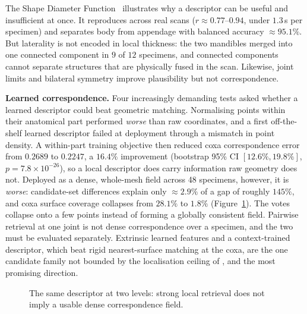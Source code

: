 The Shape Diameter Function~\cite{sdf} illustrates why a descriptor can be
useful and insufficient at once. It reproduces across real scans
($r\approx0.77$--$0.94$, under $1.3$\,s per specimen) and separates body from
appendage with balanced accuracy $\approx95.1\%$. But laterality is not encoded
in local thickness: the two mandibles merged into one connected component in
$9$ of $12$ specimens, and connected components cannot separate structures that
are physically fused in the scan. Likewise, joint limits and bilateral symmetry
improve plausibility but not correspondence.

\textbf{Learned correspondence.} Four increasingly demanding tests asked
whether a learned descriptor could beat geometric matching. Normalising points
within their anatomical part performed \emph{worse} than raw coordinates, and a
first off-the-shelf learned descriptor failed at deployment through a mismatch
in point density. A within-part training objective then reduced coxa
correspondence error from $0.2689$ to $0.2247$, a $16.4\%$ improvement
(bootstrap 95\% CI $[12.6\%,19.8\%]$, $p=7.8\times10^{-26}$), so a local
descriptor does carry information raw geometry does not. Deployed as a dense,
whole-mesh field across 48 specimens, however, it is \emph{worse}: candidate-set
differences explain only $\approx2.9\%$ of a gap of roughly $145\%$, and coxa
surface coverage collapses from $28.1\%$ to $1.8\%$
(Figure~\ref{fig:local-vs-global}). The votes collapse onto a few points
instead of forming a globally consistent field. Pairwise retrieval at one joint
is not dense correspondence over a specimen, and the two must be evaluated
separately. Extrinsic learned features and a context-trained descriptor, which
beat rigid nearest-surface matching at the coxa, are the one candidate family
not bounded by the localisation ceiling of , and the most promising
direction.

\begin{figure}[!htb]
\centering
{}
\caption[Local success versus global consistency]{The same descriptor at two
levels: strong local retrieval does not imply a usable dense correspondence
field.}
\label{fig:local-vs-global}
\end{figure}

